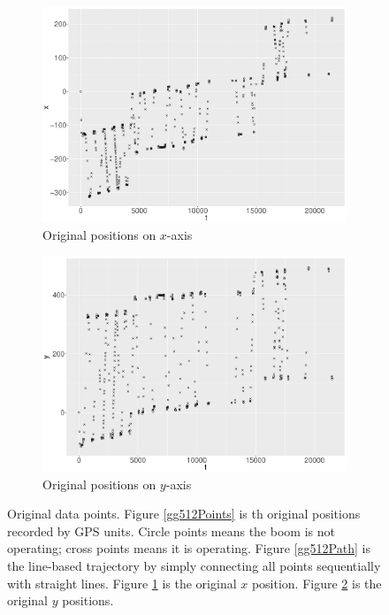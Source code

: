 \begin{figure}
\begin{subfigure}{0.45\textwidth}
    \includegraphics[width=\textwidth]{Chapters/02TractorSplineTheory/plot/ggplot/gg512PointsX.pdf}
    \caption{Original positions on $x$-axis}\label{gg512PointsX}
    \end{subfigure}
    \begin{subfigure}{0.45\textwidth}
    \centering
    \includegraphics[width=\textwidth]{Chapters/02TractorSplineTheory/plot/ggplot/gg512PointsY.pdf}
    \caption{Original positions on $y$-axis}\label{gg512PointsY}
    \end{subfigure}
\caption{Original data points. Figure \ref{gg512Points} is th original positions recorded by GPS units. Circle points means the boom is not operating; cross points means it is operating. Figure \ref{gg512Path} is the line-based trajectory by simply connecting all points sequentially with straight lines. Figure \ref{gg512PointsX} is the original $x$ position. Figure \ref{gg512PointsY} is the original $y$ positions.}\label{original512}
 \end{figure}


